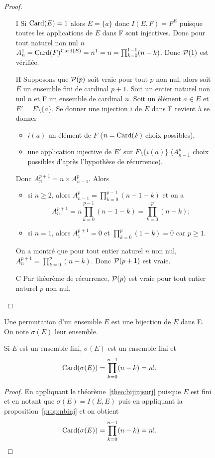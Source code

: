 \begin{figure}
\begin{proof}
\begin{itemize}
  \item[I] Si \(\Card(E)=1\) alors \(E=\{a\}\) donc \(I(E,F)=F^E\) puisque toutes les applications de \(E\) dans F sont injectives. Donc pour tout naturel non nul \(n\) \(A_n^1=\Card(F)^{\Card(E)}=n^1=n=\prod_{k=0}^{1-1}(n-k)\). Donc \(\P(1)\) est vérifiée.
  \item[H] Supposons que \(\P(p)\) soit vraie pour tout \(p\) non nul, alors soit \(E\) un ensemble fini de cardinal \(p+1\). Soit un entier naturel non nul \(n\) et F un ensemble de cardinal \(n\). Soit un élément \(a\in E\) et \(E'=E\setminus\{a\}\). Se donner une injection \(i\) de \(E\) dans F revient à se donner
    \begin{itemize}
    \item \(i(a)\) un élément de \(F\) (\(n=\Card(F)\) choix possibles),
    \item une application injective de \(E'\) sur \(F\setminus\{i(a)\}\) (\(A_{n-1}^p\) choix possibles d'après l'hypothèse de récurrence).
    \end{itemize}
    Donc \(A_{n}^{p+1}=n \times A_{n-1}^p\). Alors 
    \begin{itemize}
    \item si \(n\geqslant 2\), alors  \(A_{n-1}^p=\prod_{k=0}^{p-1}(n-1-k)\) et on a
      \begin{equation}
        A_{n}^{p+1}=n\prod_{k=0}^{p-1}(n-1-k)=\prod_{k=0}^{p}(n-k);
      \end{equation}
    \item si \(n=1\), alors \(A_{1}^{p+1}=0\) et \(\prod_{k=0}^{p}(1-k)=0\) car \(p\geqslant 1\).
    \end{itemize}
    On a montré que pour tout entier naturel \(n\) non nul, \(A_{n}^{p+1}=\prod_{k=0}^{p}(n-k)\). Donc \(\P(p+1)\) est vraie.
  \item[C] Par théorème de récurrence, \(\P(p)\) est vraie pour tout entier naturel \(p\) non nul.
  \end{itemize}
\end{proof}
\begin{defdef}
  Une permutation d'un ensemble \(E\) est une bijection de \(E\) dans E. On note \(\sigma(E)\) leur ensemble.
\end{defdef}
\begin{prop}
  Si \(E\) est un ensemble fini, \(\sigma(E)\) est un ensemble fini et
  \begin{equation}
    \Card(\sigma(E))=\prod_{k=0}^{n-1}(n-k)=n!.
  \end{equation}
\end{prop}
\begin{proof}
  En appliquant le théorème~\ref{theo:bijinjsurj} puisque \(E\) est fini et en notant que \(\sigma(E)=I(E,E)\) puis en appliquant la proposition~\ref{prop:nbinj} et on obtient
  \begin{equation}
    \Card(\sigma(E))=\prod_{k=0}^{n-1}(n-k)=n!.
  \end{equation}
\end{proof}


\end{figure}
